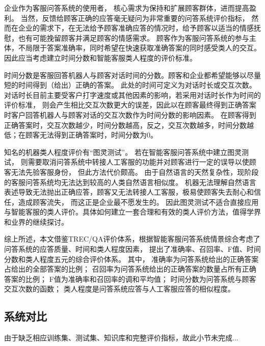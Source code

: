 企业作为客服问答系统的使用者， 核心需求为保持和扩展顾客群体，进而提高盈利。
当然，反馈给顾客正确的应答毫无疑问为非常重要的问答系统评价指标，
然而在企业的需求下，在无法给予顾客准确应答的情况时，给予顾客以适当的情感抚慰，也有可能挽留顾客并满足顾客的情感需求。
顾客作为客服问答系统的参与主体，不局限于答案准确率，同时希望在快速获取准确答案的同时感受类人的交互。
因此应当考虑建立时间分数和智能客服类人程度的评价标准。

时间分数是客服回答机器人与顾客对话时间的分数。顾客和企业都希望能够以尽量短的时间得到（给出）正确的答案。
此处的时间可定义为对话时长或交互次数。对话时长目前主要受客户打字速度或其他因素的影响，若采用对话时长作为时间的评价标准，
则会产生相比交互次数更大的误差，因此以在顾客最终得到正确答案时客户回答机器人与顾客对话的交互次数作为时间分数的影响因素。
在顾客得到正确答案时，交互次数越少，时间分数越高，反之，交互次数越多，时间分数越低；在顾客无法得到正确答案时，时间分数为0。

知名的机器类人程度评价有“图灵测试”。
若在智能客服问答系统中建立图灵测试，
则需要取消问答系统中转接人工客服的功能并对顾客进行一定的误导以使顾客无法先验客服身份，
但此方法代价颇高。
由于自然语言的天然复杂性，现阶段的客服问答系统均无法达到较高的人类自然语言相似度。
机器无法理解自然语言表述导致无法抛出正确应答，顾客又无法转接人工客服，极易使顾客失去耐心和信任，造成顾客流失，
而这正是企业最不愿发生的。
因此图灵测试不适合直接应用与智能客服的类人评价。具体如何建立一套合理和有效的类人评价方法，值得学界和业界的继续探讨。

综上所述，本文借鉴TREC/QA评价体系，根据智能客服问答系统情景综合考虑了问答系统的应答质量、时间和类人程度因素，
提出了准确率、召回率、F值、时间分数和类人程度五元的综合评价体系。
其中，
准确率为问答系统给出的正确答案占给出的全部答案的比例；
召回率为问答系统给出的正确答案的数量占所有正确答案的比例；
F值为准确率和召回率的调和平均值；
时间分数为问答系统与顾客交互次数的函数；
类人程度是问答系统应答与人工客服应答的相似程度。

\subsection{系统对比}

由于缺乏相应训练集、测试集、知识库和完整评价指标，故此小节未完成...